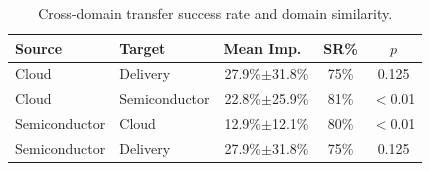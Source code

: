 \begin{table}[t]
\caption{Cross-domain transfer success rate and domain similarity.}
\label{tab:transfer}
\centering
\begin{tabular}{@{}llccc@{}}
\toprule
Source & Target & Mean Imp.\ & SR\% & $p$ \\
\midrule
  Cloud & Delivery & 27.9\%$\pm$31.8\% & 75\% & 0.125 \\
  Cloud & Semiconductor & 22.8\%$\pm$25.9\% & 81\% & $<$0.01 \\
  Semiconductor & Cloud & 12.9\%$\pm$12.1\% & 80\% & $<$0.01 \\
  Semiconductor & Delivery & 27.9\%$\pm$31.8\% & 75\% & 0.125 \\
\bottomrule
\end{tabular}
\end{table}